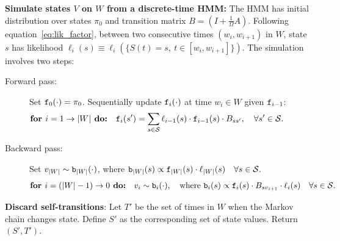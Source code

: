 \begin{algorithm}[H]
\begin{algorithmic}[1]
\State \textbf{ Simulate states $V$ on $W$ from a discrete-time HMM:} 
The HMM has initial distribution over states $\pi_0$ and transition matrix $B = \left(I+\frac{1}{\Omega}A\right)$.
 Following equation~\eqref{eq:lik_factor}, between two consecutive times $(w_i,w_{i+1})$ in $W$, state $s$ has 
likelihood $\ell_i(s) \equiv \ell_i(\{S(t) = s,\ t \in [w_i,w_{i+1}]\})$. The simulation involves two steps: 
\begin{description}
  \item[Forward pass:] 
    Set $\mathtt{f}_0(\cdot) = \pi_0$.
    Sequentially update $\mathtt{f}_i(\cdot)$ at time $w_i \in W$ given $\mathtt{f}_{i-1}$: 
    $$\textbf{for } i=1\rightarrow |W|\textbf{ do:} \quad \mathtt{f}_i(s') = \sum_{s \in {\mathcal S}} \ell_{i-1}(s) \cdot \mathtt{f}_{i-1}(s)\cdot B_{ss'}, \quad \forall s' \in {\mathcal S}.\qquad\qquad\quad $$
  \item[Backward pass:]
    Set $v_{|W|} \sim \mathtt{b}_{|W|}(\cdot)$, where $\mathtt{b}_{|W|}(s) \propto \mathtt{f}_{|W|}(s)\cdot\ell_{|W|}(s) \quad \forall s \in {\mathcal S}.$ 
    $$ \textbf{for } i=(|W|-1)\rightarrow 0\textbf{ do:} \quad v_i \sim \mathtt{b}_i(\cdot),\quad \text{where } 
    \mathtt{b}_i(s) \propto \mathtt{f}_i(s)\cdot B_{sv_{i+1}} \cdot \ell_i(s)  \quad \forall s \in {\mathcal S}.$$
    
\end{description}
\State \textbf{Discard self-transitions}: Let $T'$ be the set of times in $W$ when the Markov chain changes state. Define $S'$ as the corresponding set of state values. Return $(S', T')$.
\end{algorithmic}
\end{algorithm}

